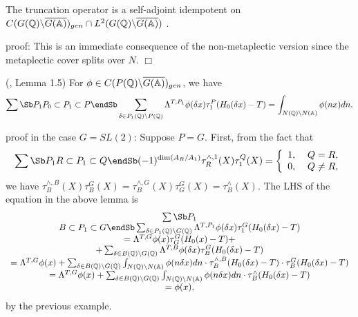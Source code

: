 \begin{lemma}
The truncation operator is a self-adjoint idempotent on
\newline
$C(G({\Bbb{Q}})\backslash \overline{G({\Bbb{A}})})_{gen}
\cap L^2(G({\Bbb{Q}})\backslash \overline{G({\Bbb{A}})})$ .
\end{lemma}
proof: This is an immediate consequence of the non-metaplectic
version \cite{A3} since the metaplectic cover splits over $N$. $\Box$

\begin{lemma}
(\cite{A3}, Lemma 1.5) For
$\phi \in C(P({\Bbb{Q}})\backslash \overline{G({\Bbb{A}})})_{gen}$, we
have 
\[
\sum\Sb P_1 \\ P_0\subset P_1\subset P \endSb
\sum_{\delta \in P_1({\Bbb{Q}})\backslash P({\Bbb{Q}})}
\Lambda ^{T,P_1}\phi (\delta x)\tau _1^P(H_0(\delta x)-T)
=\int_{N({\Bbb{Q}})\backslash N({\Bbb{A}})}\phi (nx)dn.
\]
\end{lemma}

proof in the case $G=SL(2)$: Suppose $P=G$. First, from the fact that 
\begin{equation}
\sum\Sb P_1  \\ R\subset P_1\subset Q  \endSb (-1)^{\dim (A_R/A_1)}\tau
_R^{\wedge ,1}(X)\tau _1^Q(X)=\left\{ 
\begin{array}{c}
1,\;\;\;\;Q=R, \\ 
0,\;\;\;\;Q\neq R,
\end{array}
\right.
\end{equation}
we have $\tau_B^{\wedge ,B}(X)\tau _B^G(X)
=\tau _B^{\wedge ,G}(X)\tau _G^G(X)=\tau_B^{\wedge }(X)$.
The LHS of the equation in the above lemma is 
\[
\begin{array}{c}
\sum\Sb P_1  \\ B\subset P_1\subset G  \endSb
\sum_{\delta \in P_1({\Bbb{Q}})\backslash G({\Bbb{Q}})}
\Lambda ^{T,P_1}\phi (\delta x)\tau _1^G(H_0(\delta x)-T) \\
=\Lambda ^{T,G}\phi (x)\tau _G^G(H_0(x)-T)+ \\
+\sum_{\delta \in B({\Bbb{Q}})\backslash G({\Bbb{Q}})}\Lambda ^{T,B}\phi
(\delta x)\tau _B^G(H_0(\delta x)-T) \\
=\Lambda ^{T,G}\phi (x)+
\sum_{\delta \in B({\Bbb{Q}})\backslash G({\Bbb{Q}})}
\int_{N({\Bbb{Q}})\backslash N({\Bbb{A}})}\phi (n\delta x)dn
\cdot \tau_B^{\wedge ,B}(H_0(\delta x)-T)\cdot \tau _B^G(H_0(\delta x)-T) \\
=\Lambda ^{T,G}\phi (x)+
\sum_{\delta \in B({\Bbb{Q}})\backslash G({\Bbb{Q}})}
\int_{N({\Bbb{Q}})\backslash N({\Bbb{A}})}
\phi (n\delta x)dn\cdot \tau_B^{\wedge }(H_0(\delta x)-T) \\
=\phi (x),
\end{array}
\]
by the previous example.

